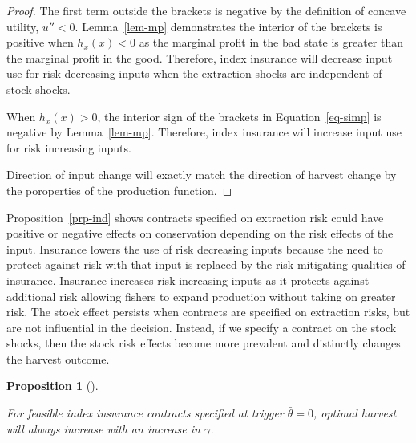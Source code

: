 \documentclass[
  letterpaper,
  DIV=11,
  numbers=noendperiod]{scrartcl}
\theoremstyle{plain}
\theoremstyle{plain}
\newtheorem{proposition}{Proposition}[section]
\theoremstyle{remark}
\begin{document}
\begin{proof}
The first term outside the brackets is negative by the definition of
concave utility, \(u''<0\). Lemma~\ref{lem-mp} demonstrates the interior
of the brackets is positive when \(h_x(x)<0\) as the marginal profit in
the bad state is greater than the marginal profit in the good.
Therefore, index insurance will decrease input use for risk decreasing
inputs when the extraction shocks are independent of stock shocks.

When \(h_x(x)>0\), the interior sign of the brackets in
Equation~\ref{eq-simp} is negative by Lemma~\ref{lem-mp}. Therefore,
index insurance will increase input use for risk increasing inputs.

Direction of input change will exactly match the direction of harvest
change by the poroperties of the production function.
\end{proof}

Proposition~\ref{prp-ind} shows contracts specified on extraction risk
could have positive or negative effects on conservation depending on the
risk effects of the input. Insurance lowers the use of risk decreasing
inputs because the need to protect against risk with that input is
replaced by the risk mitigating qualities of insurance. Insurance
increases risk increasing inputs as it protects against additional risk
allowing fishers to expand production without taking on greater risk.
The stock effect persists when contracts are specified on extraction
risks, but are not influential in the decision. Instead, if we specify a
contract on the stock shocks, then the stock risk effects become more
prevalent and distinctly changes the harvest outcome.

\begin{proposition}[]\protect\hypertarget{prp-theta}{}\label{prp-theta}

For feasible index insurance contracts specified at trigger
\(\bar\theta=0\), optimal harvest will always increase with an increase
in \(\gamma\).

\end{proposition}
\end{document}
